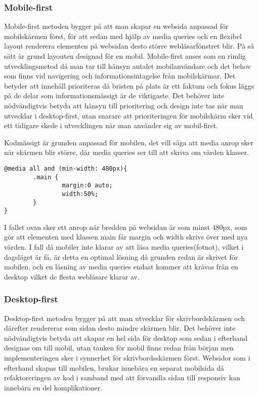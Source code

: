 \documentclass[11pt]{article}
\begin{document}
\subsubsection{Mobile-first}
Mobile-first metoden bygger på att man skapar en websida anpassad för mobilskärmen först, för att sedan med hjälp av media queries och en flexibel layout renderera elementen på websidan desto större webläsarfönstret blir.  På så sätt är grund layouten designad för en mobil. Mobile-first anses som en rimlig utvecklingsmetod då man tar till hänsyn antalet mobilanvändare och det behov som finns vid navigering och informationsintagelse från mobilskärmar.  Det betyder att innehåll prioriteras då bristen på plats är ett faktum och fokus läggs på de delar som informationsmässigt är de viktigaste. Det behöver inte nödvändigtvis betyda att hänsyn till prioritering och design inte tas när man utvecklar i desktop-first, utan snarare att prioriteringen för mobilskärm sker vid ett tidigare skede i utvecklingen när man använder sig av mobil-first.

Kodmässigt är grunden anpassad för mobilen, det vill säga att media anrop sker när skärmen blir större, där media queries ser till att skriva om värden klasser. 

 \begin{verbatim}
@media all and (min-width: 480px){
        .main {
                margin:0 auto;
                width:50%;
        }
}
\end{verbatim}

I fallet ovan sker ett anrop när bredden på websidan är som minst 480px, som gör att elementen med klassen main får margin och width skrivs över med nya värden. I fall då mobiler inte klarar av att läsa media queries(fotnot), vilket i dagsläget är få, är detta en optimal lösning då grunden redan är skrivet för mobilen, och en läsning av media queries endast kommer att krävas från en desktop vilket de flesta webläsare klarar av.

\subsubsection{Desktop-first}
Desktop-first metoden bygger på att man utvecklar för skrivbordskärmen och därefter rendererar som sidan desto mindre skärmen blir. Det behöver inte nödvändigtvis betyda att skapar en hel sida för desktop som sedan i efterhand designas om till mobil, utan tanken för mobil finns redan från början men implementeringen sker i synnerhet för skrivbordsskärmen först. Websidor som i efterhand skapas till mobilen, brukar innebära en separat mobilsida då refaktoreringen av kod i samband med att förvandla sidan till responsiv kan innebära en del komplikationer.  
\end{document}

